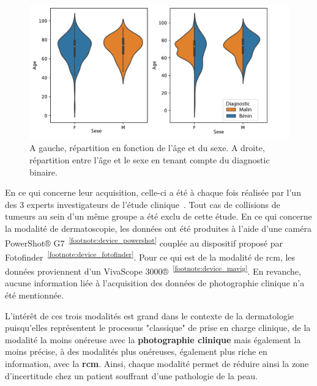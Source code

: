 \begin{figure}[H]
    \centering
    \includegraphics[width=0.8\linewidth]{contents/chapter_2/resources/statistics_age_sex.pdf}
    \caption{A gauche, répartition en fonction de l'âge et du sexe. A droite, répartition entre l'âge et le sexe en tenant compte du diagnostic binaire.}
    \label{fig:statistics}
\end{figure}\par

En ce qui concerne leur acquisition, celle-ci a été à chaque fois réalisée par l'un des 3 experts investigateurs de l'étude clinique~\cite{Cinotti2018}. Tout cas de collisions de tumeurs au sein d'un même groupe a été exclu de cette étude. En ce qui concerne la modalité de dermatoscopie, les données ont été produites à l'aide d'une caméra PowerShot® G7~\textsuperscript{\ref{footnote:device_powershot}} couplée au dispositif proposé par Fotofinder~\textsuperscript{\ref{footnote:device_fotofinder}}. Pour ce qui est de la modalité de \gls{rcm}, les données proviennent d'un VivaScope 3000®~\textsuperscript{\ref{footnote:device_mavig}}. En revanche, aucune information liée à l'acquisition des données de photographie clinique n'a été mentionnée.\par

L'intérêt de ces trois modalités est grand dans le contexte de la dermatologie puisqu'elles représentent le processus "classique" de prise en charge clinique, de la modalité la moins onéreuse avec la \textbf{photographie clinique} mais également la moins précise, à des modalités plus onéreuses, également plus riche en information, avec la \textbf{\gls{rcm}}. Ainsi, chaque modalité permet de réduire ainsi la zone d'incertitude chez un patient souffrant d'une pathologie de la peau.

\addtocounter{footnote}{1}
\addtocounter{footnote}{1}
\addtocounter{footnote}{1}

